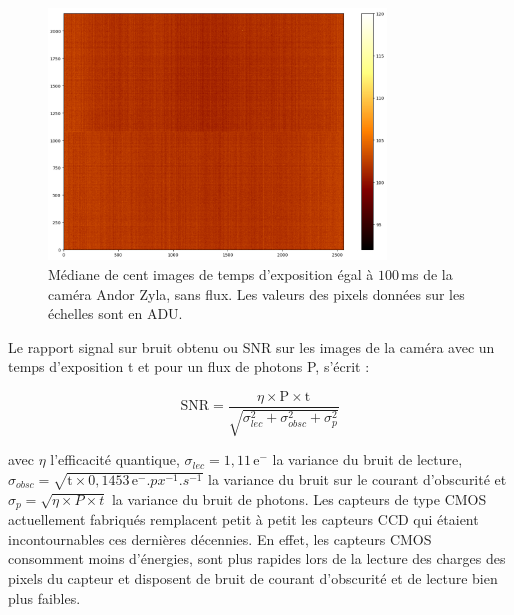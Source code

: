 \begin{figure}[ht!]
    \centering
    \includegraphics[width=0.8\textwidth]{Figure_Chap3/20220705_DarkFullImage_100ms_24C_median.png}
    \caption[Image sans flux de la caméra Andor Zyla de FIRSTv2.]{Médiane de cent images de temps d'exposition égal à $100 \,$ms de la caméra Andor Zyla, sans flux. Les valeurs des pixels données sur les échelles sont en \ac{ADU}.}
    \label{fig:CameraDark}
\end{figure}

Le rapport signal sur bruit obtenu ou \ac{SNR} sur les images de la caméra avec un temps d'exposition t et pour un flux de photons P, s'écrit :

\begin{equation}
    \text{SNR} = \frac{\eta \times \text{P} \times \text{t}}{\sqrt{\sigma_{lec}^{2} + \sigma_{obsc}^{2} + \sigma_{p}^{2}}}
\end{equation}

\noindent avec $\eta$ l'efficacité quantique, $\sigma_{lec} = 1,11 \,\text{e}^-$ la variance du bruit de lecture, $\sigma_{obsc} = \sqrt{\text{t} \times 0,1453 \,\text{e}^-.px^{-1}.s^{-1}}$ la variance du bruit sur le courant d'obscurité et $\sigma_{p} = \sqrt{\eta \times P \times t}$ la variance du bruit de photons. Les capteurs de type \ac{CMOS} actuellement fabriqués remplacent petit à petit les capteurs \ac{CCD} qui étaient incontournables ces dernières décennies. En effet, les capteurs \ac{CMOS} consomment moins d'énergies, sont plus rapides lors de la lecture des charges des pixels du capteur et disposent de bruit de courant d'obscurité et de lecture bien plus faibles.

